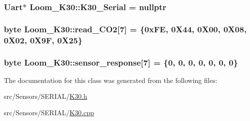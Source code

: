 \subsubsection[{\texorpdfstring{K30\+\_\+\+Serial}{K30_Serial}}]{\setlength{\rightskip}{0pt plus 5cm}Uart$\ast$ Loom\+\_\+\+K30\+::\+K30\+\_\+\+Serial = nullptr\hspace{0.3cm}{\ttfamily [protected]}}\hypertarget{class_loom___k30_a6066aba52897fee08390c9e6a5baf688}{}\label{class_loom___k30_a6066aba52897fee08390c9e6a5baf688}
\subsubsection[{\texorpdfstring{read\+\_\+\+C\+O2}{read_CO2}}]{\setlength{\rightskip}{0pt plus 5cm}byte Loom\+\_\+\+K30\+::read\+\_\+\+C\+O2\mbox{[}7\mbox{]} = \{0x\+F\+E, 0\+X44, 0\+X00, 0\+X08, 0\+X02, 0\+X9\+F, 0\+X25\}\hspace{0.3cm}{\ttfamily [protected]}}\hypertarget{class_loom___k30_a0b8f6461001363a009dc206347084264}{}\label{class_loom___k30_a0b8f6461001363a009dc206347084264}
\subsubsection[{\texorpdfstring{sensor\+\_\+response}{sensor_response}}]{\setlength{\rightskip}{0pt plus 5cm}byte Loom\+\_\+\+K30\+::sensor\+\_\+response\mbox{[}7\mbox{]} = \{0, 0, 0, 0, 0, 0, 0\}\hspace{0.3cm}{\ttfamily [protected]}}\hypertarget{class_loom___k30_a82e7ef99aa9ee1709271bfe491e35632}{}\label{class_loom___k30_a82e7ef99aa9ee1709271bfe491e35632}


The documentation for this class was generated from the following files\+:\begin{DoxyCompactItemize}
\item 
src/\+Sensors/\+S\+E\+R\+I\+A\+L/\hyperlink{_k30_8h}{K30.\+h}\item 
src/\+Sensors/\+S\+E\+R\+I\+A\+L/\hyperlink{_k30_8cpp}{K30.\+cpp}\end{DoxyCompactItemize}
